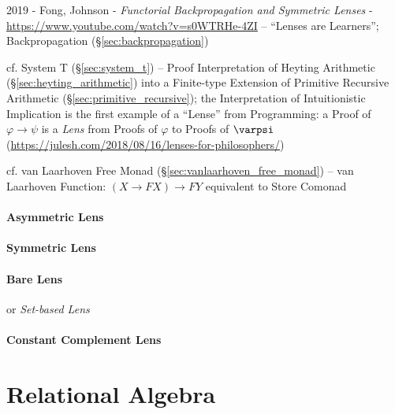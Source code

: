 2019 - Fong, Johnson - \emph{Functorial Backpropagation and Symmetric Lenses} -
\url{https://www.youtube.com/watch?v=s0WTRHe-4ZI} -- ``Lenses are Learners'';
\fist Backpropagation (\S\ref{sec:backpropagation})

\fist cf. System T (\S\ref{sec:system_t}) -- Proof Interpretation of Heyting
Arithmetic (\S\ref{sec:heyting_arithmetic}) into a Finite-type Extension of
Primitive Recursive Arithmetic (\S\ref{sec:primitive_recursive}); the
Interpretation of Intuitionistic Implication is the first example of a ``Lense''
from Programming: a Proof of $\varphi \rightarrow \psi$ is a \emph{Lens} from
Proofs of $\varphi$ to Proofs of $\varpsi$
(\url{https://julesh.com/2018/08/16/lenses-for-philosophers/})

\fist cf. van Laarhoven Free Monad (\S\ref{sec:vanlaarhoven_free_monad}) -- van
Laarhoven Function: $(X \rightarrow F X) \rightarrow F Y$ equivalent to Store
Comonad



\paragraph{Asymmetric Lens}\label{sec:asymmetric_lens}\hfill

\paragraph{Symmetric Lens}\label{sec:symmetric_lens}\hfill

\paragraph{Bare Lens}\label{sec:bare_lens}\hfill

or \emph{Set-based Lens}



\paragraph{Constant Complement Lens}\label{sec:constant_complement_lens}\hfill



\section{Relational Algebra}\label{sec:relational_algebra}

